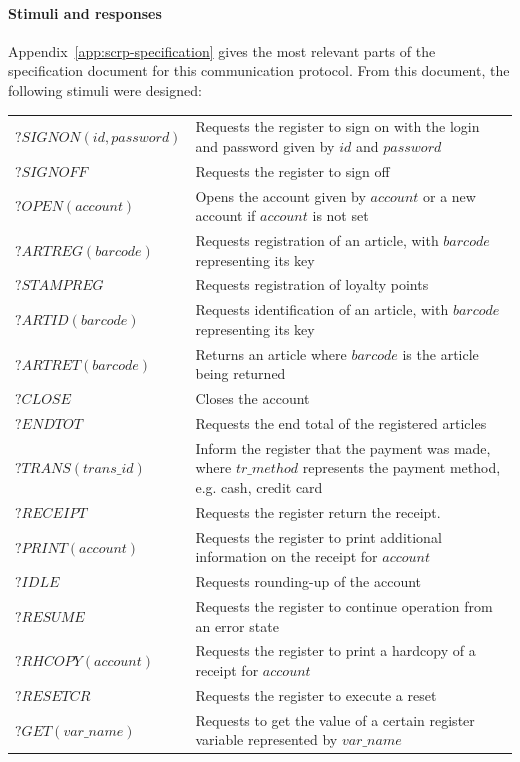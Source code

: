 \paragraph*{Stimuli and responses}
Appendix~\ref{app:scrp-specification} gives the most relevant parts of the specification document for this communication protocol. From this document, the following stimuli were designed:
\vspace{5px} \\
\begin{tabular}{lp{280px}} 
$\mathit{?SIGNON(id, password)}$ & Requests the register to sign on with the login and password given by $\mathit{id}$ and $\mathit{password}$\\
$\mathit{?SIGNOFF}$ & Requests the register to sign off\\
$\mathit{?OPEN(account)}$ & Opens the account given by $\mathit{account}$ or a new account if $\mathit{account}$ is not set\\
$\mathit{?ARTREG(barcode)}$ & Requests registration of an article, with $\mathit{barcode}$ representing its key \\
$\mathit{?STAMPREG}$ & Requests registration of loyalty points \\
$\mathit{?ARTID(barcode)}$ & Requests identification of an article, with $\mathit{barcode}$ representing its key\\
$\mathit{?ARTRET(barcode)}$ & Returns an article where $\mathit{barcode}$ is the article being returned \\
$\mathit{?CLOSE}$ & Closes the account\\
$\mathit{?ENDTOT}$ & Requests the end total of the registered articles\\
$\mathit{?TRANS(trans\_id)}$ & Inform the register that the payment was made, where $\mathit{tr\_method}$ represents the payment method, e.g. cash, credit card\\
$\mathit{?RECEIPT}$ & Requests the register return the receipt.\\
$\mathit{?PRINT(account)}$ & Requests the register to print additional information on the receipt for $\mathit{account}$\\
$\mathit{?IDLE}$ & Requests rounding-up of the account\\
$\mathit{?RESUME}$ & Requests the register to continue operation from an error state\\
$\mathit{?RHCOPY(account)}$ & Requests the register to print a hardcopy of a receipt for $\mathit{account}$\\
$\mathit{?RESETCR}$ & Requests the register to execute a reset \\
$\mathit{?GET(var\_name)}$ & Requests to get the value of a certain register variable represented by $\mathit{var\_name}$
\end{tabular}

